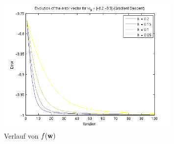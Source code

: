 \begin{figure}[h!]
  \centering
  \includegraphics[width=0.8\textwidth]{./figures/211/error_w02.png}
  \caption{Verlauf von $f(\mathbf{w})$}
  \label{fig:211_error_w02}
\end{figure}

\clearpage

